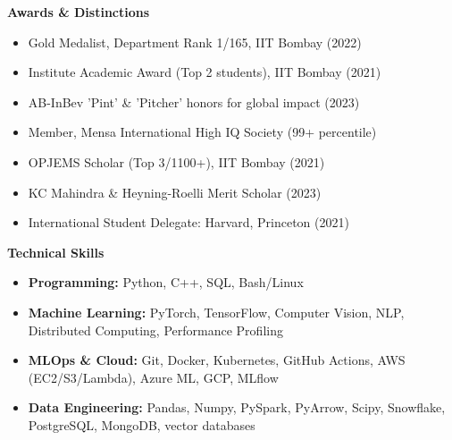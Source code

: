 \documentclass[letterpaper,10pt]{article}
\begin{document}
\titlerule
\vspace{4pt}
{\small
\begin{multicols}{2}

{\vspace{-4pt}\scshape\raggedright\large\bfseries Awards \& Distinctions}
\begin{itemize}[leftmargin=0.15in, itemsep=-2pt]
  \item Gold Medalist, Department Rank 1/165, IIT Bombay (2022)
  \item Institute Academic Award (Top 2 students), IIT Bombay (2021)
  \item AB-InBev 'Pint' \& 'Pitcher' honors for global impact (2023)
  \item Member, Mensa International High IQ Society (99+ percentile)
  \item OPJEMS Scholar  (Top 3/1100+), IIT Bombay (2021)
  \item KC Mahindra \& Heyning-Roelli Merit Scholar  (2023)
  \item International Student Delegate: Harvard, Princeton (2021)
\end{itemize}

\columnbreak

{\vspace{-4pt} \scshape\raggedright\large\bfseries Technical Skills}
\begin{itemize}[leftmargin=0.15in]
  \item \textbf{Programming:} Python, C++, SQL, Bash/Linux 
  \item \textbf{Machine Learning:} PyTorch, TensorFlow, Computer Vision, NLP, Distributed Computing, Performance Profiling
  \item \textbf{MLOps \& Cloud:} Git, Docker, Kubernetes, GitHub Actions, AWS (EC2/S3/Lambda), Azure ML, GCP, MLflow
  \item \textbf{Data Engineering:} Pandas, Numpy, PySpark, PyArrow, Scipy, Snowflake, PostgreSQL, MongoDB, vector databases
\end{itemize}
\end{multicols}
}

\end{document}
